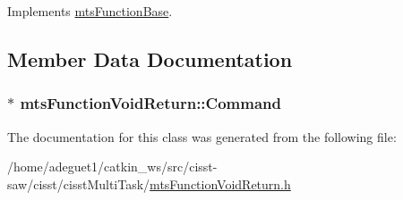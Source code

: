 Implements \hyperlink{classmts_function_base_ae6e5497be34d5563f2df3cb24d68e959}{mts\-Function\-Base}.



\subsection{Member Data Documentation}
\hypertarget{classmts_function_void_return_a8a5d1544b3dd7fabb94e62dce744c9b2}{
\subsubsection[{Command}]{$\ast$ mts\-Function\-Void\-Return\-::\-Command\hspace{0.3cm}{\ttfamily [protected]}}}\label{classmts_function_void_return_a8a5d1544b3dd7fabb94e62dce744c9b2}


The documentation for this class was generated from the following file\-:\begin{DoxyCompactItemize}
\item 
/home/adeguet1/catkin\-\_\-ws/src/cisst-\/saw/cisst/cisst\-Multi\-Task/\hyperlink{mts_function_void_return_8h}{mts\-Function\-Void\-Return.\-h}\end{DoxyCompactItemize}
